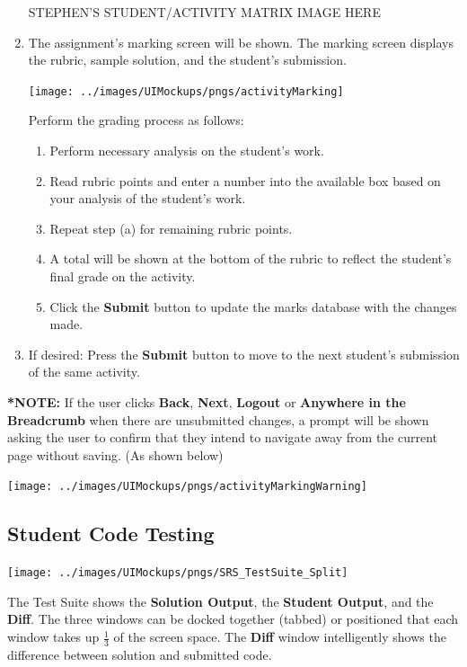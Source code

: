 \documentclass{article}
\begin{document}
\begin{enumerate}
  \begin{center} 
    STEPHEN'S STUDENT/ACTIVITY MATRIX IMAGE HERE
  \end{center}
  \item The assignment's marking screen will be shown.  The marking screen
    displays the rubric, sample solution, and the student's submission.
  \begin{center} 
   \texttt{[image: ../images/UIMockups/pngs/activityMarking]}
   \label{marking}
  \end{center}
    Perform the grading process as follows:
    \begin{enumerate}
      \item Perform necessary analysis on the student's work. 
      \item Read rubric points and enter a number into the available box 
        based on your analysis of the student's work.
      \item Repeat step (a) for remaining rubric points.
      \item A total will be shown at the bottom of the rubric to reflect the
        student's final grade on the activity.
       \item Click the \textbf{Submit} button to update the marks database with
         the changes made.
    \end{enumerate}

  \item If desired: Press the \textbf{Submit} button to move to the next
    student's submission of the same activity.
\end{enumerate}
\textbf{*NOTE: }If the user clicks \textbf{Back}, \textbf{Next}, \textbf{Logout}
or \textbf{Anywhere in the Breadcrumb} when there are unsubmitted changes, a
prompt will be shown asking the user to confirm that they intend to navigate away
from the current page without saving. (As shown below)

\begin{center}
  \texttt{[image: ../images/UIMockups/pngs/activityMarkingWarning]}
\end{center}

\subsection{Student Code Testing}
\begin{center}
\texttt{[image: ../images/UIMockups/pngs/SRS\_TestSuite\_Split]}
\label{testSuite}
\end{center}
The Test Suite shows the \textbf{Solution Output}, the \textbf{Student Output},
and the \textbf{Diff}.
The three windows can be docked together (tabbed) or positioned that each
window takes up $\frac{1}{3}$ of the screen space.
The \textbf{Diff} window intelligently shows the difference between
solution and submitted code.
\end{document}
